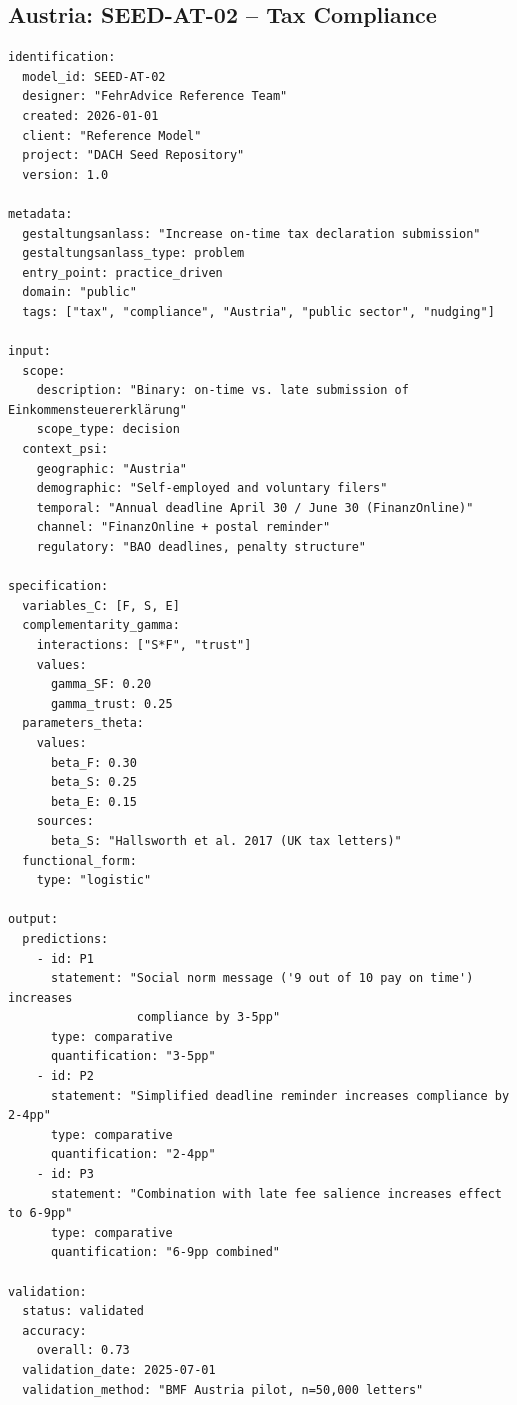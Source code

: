 \subsection{Austria: SEED-AT-02 -- Tax Compliance}

\begin{tcolorbox}[colback=white, colframe=blue!50!black,
    title=SEED-AT-02: Tax Declaration Timeliness (Austria)]
\begin{verbatim}
identification:
  model_id: SEED-AT-02
  designer: "FehrAdvice Reference Team"
  created: 2026-01-01
  client: "Reference Model"
  project: "DACH Seed Repository"
  version: 1.0

metadata:
  gestaltungsanlass: "Increase on-time tax declaration submission"
  gestaltungsanlass_type: problem
  entry_point: practice_driven
  domain: "public"
  tags: ["tax", "compliance", "Austria", "public sector", "nudging"]

input:
  scope:
    description: "Binary: on-time vs. late submission of Einkommensteuererklärung"
    scope_type: decision
  context_psi:
    geographic: "Austria"
    demographic: "Self-employed and voluntary filers"
    temporal: "Annual deadline April 30 / June 30 (FinanzOnline)"
    channel: "FinanzOnline + postal reminder"
    regulatory: "BAO deadlines, penalty structure"

specification:
  variables_C: [F, S, E]
  complementarity_gamma:
    interactions: ["S*F", "trust"]
    values:
      gamma_SF: 0.20
      gamma_trust: 0.25
  parameters_theta:
    values:
      beta_F: 0.30
      beta_S: 0.25
      beta_E: 0.15
    sources:
      beta_S: "Hallsworth et al. 2017 (UK tax letters)"
  functional_form:
    type: "logistic"

output:
  predictions:
    - id: P1
      statement: "Social norm message ('9 out of 10 pay on time') increases
                  compliance by 3-5pp"
      type: comparative
      quantification: "3-5pp"
    - id: P2
      statement: "Simplified deadline reminder increases compliance by 2-4pp"
      type: comparative
      quantification: "2-4pp"
    - id: P3
      statement: "Combination with late fee salience increases effect to 6-9pp"
      type: comparative
      quantification: "6-9pp combined"

validation:
  status: validated
  accuracy:
    overall: 0.73
  validation_date: 2025-07-01
  validation_method: "BMF Austria pilot, n=50,000 letters"
\end{verbatim}
\end{tcolorbox}


